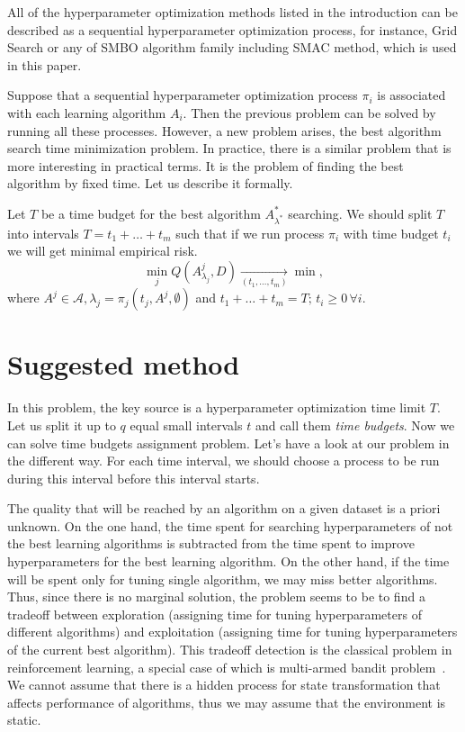 \documentclass{svproc}
\begin{document}
All of the hyperparameter optimization methods listed in the introduction can be described as a sequential hyperparameter optimization process, for instance, Grid Search or any of SMBO algorithm family including SMAC method, which is used in this paper. 
 
Suppose that a sequential hyperparameter optimization process $\pi_i$ is associated with each learning algorithm $A_i.$ Then the previous problem can be solved by running all these processes. However, a new problem arises, the best algorithm search time minimization problem. In practice, there is a similar problem that is more interesting in practical terms. It is the problem of finding the best algorithm by fixed time. Let us describe it formally.

Let $T$ be a time budget for the best algorithm $A^*_{\lambda^*}$ searching. We should split $T$ into intervals $T = t_1 + \dots + t_m$ such that if we run process $\pi_i$ with time budget $t_i$ we will get minimal empirical risk.
\[
\min_{j} Q(A_{\lambda_j}^j, D)\xrightarrow
[\left(t_1, \ldots, t_m\right)]{} \min,
\]
where $A^j \in \mathscr{A}, \lambda_j=\pi_j(t_j, A^j, \emptyset)$ and ${t_1+\ldots+t_m=T;\, t_i\ge 0\, \forall i}.$


\section{Suggested method}
\label{sec:suggest}

In this problem, the key source is a hyperparameter optimization time limit $T$. Let us split it up to $q$ equal small intervals $t$ and call them \emph{time budgets}. Now we can solve time budgets assignment problem. Let’s have a look at our problem in the different way. For each time interval, we should choose a process to be run during this interval before this interval starts.

The quality that will be reached by an algorithm on a given dataset is a priori unknown. On the one hand, the time spent for searching hyperparameters of not the best learning algorithms is subtracted from the time spent to improve hyperparameters for the best learning algorithm. On the other hand, if the time will be spent only for tuning single algorithm, we may miss better algorithms. Thus, since there is no marginal solution, the problem seems to be to find a tradeoff between exploration (assigning time for tuning hyperparameters of different algorithms) and exploitation (assigning time for tuning hyperparameters of the current best algorithm). This tradeoff detection is the classical problem in reinforcement learning, a special case of which is multi-armed bandit problem~\cite{reinfl}. We cannot assume that there is a hidden process for state transformation that affects performance of algorithms, thus we may assume that the environment is static.   
\end{document}
